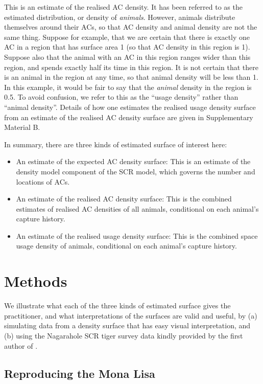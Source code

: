 \documentclass[useAMS,usenatbib,referee]{biom}
\begin{document}
This is an estimate of the realised AC density. It has been referred to as the estimated distribution, or density of \textit{animals}. However, animals distribute themselves around their ACs, so that AC density and animal density are not the same thing. Suppose for example, that we are certain that there is exactly one AC in a region that has surface area 1 (so that AC density in this region is 1). Suppose also that the animal with an AC in this region ranges wider than this region, and spends exactly half its time in this region. It is not certain that there is an animal in the region at any time, so that animal density will be less than 1. In this example, it would be fair to say that the \textit{animal} density in the region is 0.5. To avoid confusion, we refer to this as the ``usage density'' rather than ``animal density''. Details of how one estimates the realised usage density surface from an estimate of the realised AC density surface are given in Supplementary Material B.

In summary, there are three kinds of estimated surface of interest here: 
\begin{itemize}
\item An estimate of the expected AC density surface: This is an estimate of the density model component of the SCR model, which governs the number and locations of ACs.
\item An estimate of the realised AC density surface: This is the combined estimates of realised AC densities of all animals, conditional on each animal's capture history.
\item An estimate of the realised usage density surface:  This is the combined space usage density of animals, conditional on each animal's capture history.
\end{itemize}

\section{Methods}

We illustrate what each of the three kinds of estimated surface gives the practitioner, and what interpretations of the surfaces are valid and useful, by (a) simulating data from a density surface that has easy visual interpretation, and (b) using the Nagarahole SCR tiger survey data kindly provided by the first author of \cite{Dorazio+Karanth:17}.

\subsection{Reproducing the Mona Lisa} \label{monalisa}
\end{document}
